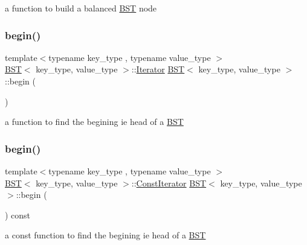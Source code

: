 a function to build a balanced \mbox{\hyperlink{class_b_s_t}{B\+ST}} node \mbox{\label{class_b_s_t_a1fa2e4ede1440f8c82a13cf650f5dea4}} 
\subsubsection{\texorpdfstring{begin()}{begin()}\hspace{0.1cm}{\footnotesize\ttfamily [1/2]}}
{\footnotesize\ttfamily template$<$typename key\+\_\+type , typename value\+\_\+type $>$ \\
\mbox{\hyperlink{class_b_s_t}{B\+ST}}$<$ key\+\_\+type, value\+\_\+type $>$\+::\mbox{\hyperlink{class_b_s_t_1_1_iterator}{Iterator}} \mbox{\hyperlink{class_b_s_t}{B\+ST}}$<$ key\+\_\+type, value\+\_\+type $>$\+::begin (\begin{DoxyParamCaption}{ }\end{DoxyParamCaption})}

a function to find the begining ie head of a \mbox{\hyperlink{class_b_s_t}{B\+ST}} \mbox{\label{class_b_s_t_a3c7bda7273cac1f486cc24c5d1198f38}} 
\subsubsection{\texorpdfstring{begin()}{begin()}\hspace{0.1cm}{\footnotesize\ttfamily [2/2]}}
{\footnotesize\ttfamily template$<$typename key\+\_\+type , typename value\+\_\+type $>$ \\
\mbox{\hyperlink{class_b_s_t}{B\+ST}}$<$ key\+\_\+type, value\+\_\+type $>$\+::\mbox{\hyperlink{class_b_s_t_1_1_const_iterator}{Const\+Iterator}} \mbox{\hyperlink{class_b_s_t}{B\+ST}}$<$ key\+\_\+type, value\+\_\+type $>$\+::begin (\begin{DoxyParamCaption}{ }\end{DoxyParamCaption}) const}

a const function to find the begining ie head of a \mbox{\hyperlink{class_b_s_t}{B\+ST}} \mbox{\label{class_b_s_t_a02200955e26dac5a2da745f7f9b73d0d}} 
